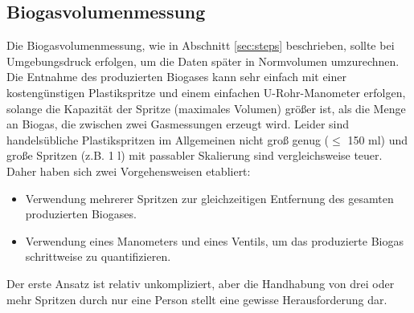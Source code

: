 \documentclass[]{article}
\begin{document}
\subsection{Biogasvolumenmessung}
\label{sec:volmeas}
Die Biogasvolumenmessung, wie in Abschnitt \ref{sec:steps} beschrieben, sollte bei Umgebungsdruck erfolgen, um die Daten später in Normvolumen umzurechnen.
Die Entnahme des produzierten Biogases kann sehr einfach mit einer kostengünstigen Plastikspritze und einem einfachen U-Rohr-Manometer erfolgen, solange die Kapazität der Spritze (maximales Volumen) größer ist, als die Menge an Biogas, die zwischen zwei Gasmessungen erzeugt wird.
Leider sind handelsübliche Plastikspritzen im Allgemeinen nicht groß genug ($\le$ 150 ml) und große Spritzen (z.B. 1 l) mit passabler Skalierung sind vergleichsweise teuer. Daher haben sich zwei Vorgehensweisen etabliert:
\begin{itemize}
  \item Verwendung mehrerer Spritzen zur gleichzeitigen Entfernung des gesamten produzierten Biogases.
  \item Verwendung eines Manometers und eines Ventils, um das produzierte Biogas schrittweise zu quantifizieren.
\end{itemize}

Der erste Ansatz ist relativ unkompliziert, aber die Handhabung von drei oder mehr Spritzen durch nur eine Person stellt eine gewisse Herausforderung dar.
\end{document}

